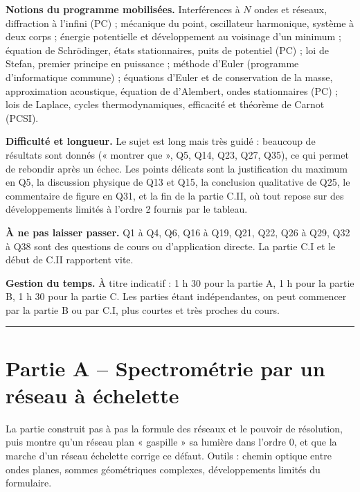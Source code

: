 \documentclass[11pt,a4paper]{article}
\begin{document}
\textbf{Notions du programme mobilisées.} Interférences à \(N\) ondes et réseaux, diffraction à l'infini (PC) ; mécanique du point, oscillateur harmonique, système à deux corps ; énergie potentielle et développement au voisinage d'un minimum ; équation de Schrödinger, états stationnaires, puits de potentiel (PC) ; loi de Stefan, premier principe en puissance ; méthode d'Euler (programme d'informatique commune) ; équations d'Euler et de conservation de la masse, approximation acoustique, équation de d'Alembert, ondes stationnaires (PC) ; lois de Laplace, cycles thermodynamiques, efficacité et théorème de Carnot (PCSI).

\textbf{Difficulté et longueur.} Le sujet est long mais très guidé : beaucoup de résultats sont donnés (« montrer que », Q5, Q14, Q23, Q27, Q35), ce qui permet de rebondir après un échec. Les points délicats sont la justification du maximum en Q5, la discussion physique de Q13 et Q15, la conclusion qualitative de Q25, le commentaire de figure en Q31, et la fin de la partie C.II, où tout repose sur des développements limités à l'ordre 2 fournis par le tableau.

\textbf{À ne pas laisser passer.} Q1 à Q4, Q6, Q16 à Q19, Q21, Q22, Q26 à Q29, Q32 à Q38 sont des questions de cours ou d'application directe. La partie C.I et le début de C.II rapportent vite.

\textbf{Gestion du temps.} À titre indicatif : 1 h 30 pour la partie A, 1 h pour la partie B, 1 h 30 pour la partie C. Les parties étant indépendantes, on peut commencer par la partie B ou par C.I, plus courtes et très proches du cours.

\begin{center}\rule{0.5\linewidth}{0.5pt}\end{center}

\hypertarget{partie-a-spectromuxe9trie-par-un-ruxe9seau-uxe0-uxe9chelette}{%
\section{Partie A -- Spectrométrie par un réseau à échelette}\label{partie-a-spectromuxe9trie-par-un-ruxe9seau-uxe0-uxe9chelette}}

La partie construit pas à pas la formule des réseaux et le pouvoir de résolution, puis montre qu'un réseau plan « gaspille » sa lumière dans l'ordre 0, et que la marche d'un réseau échelette corrige ce défaut. Outils : chemin optique entre ondes planes, sommes géométriques complexes, développements limités du formulaire.
\end{document}
